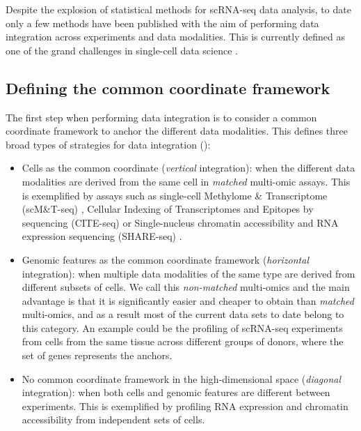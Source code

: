 Despite the explosion of statistical methods for scRNA-seq data analysis, to date only a few methods have been published with the aim of performing data integration across experiments and data modalities. This is currently defined as one of the grand challenges in single-cell data science \cite{Lahnemann2020}.

\subsection{Defining the common coordinate framework}

The first step when performing data integration is to consider a common coordinate framework to anchor the different data modalities. This defines three broad types of strategies for data integration (): 

\begin{itemize}

	\item Cells as the common coordinate (\textit{vertical} integration): when the different data modalities are derived from the same cell in \textit{matched} multi-omic assays. This is exemplified by assays such as single-cell Methylome \& Transcriptome (scM\&T-seq) \cite{Angermueller2016}, Cellular Indexing of Transcriptomes and Epitopes by sequencing (CITE-seq) \cite{Stoeckius2017} or Single-nucleus chromatin accessibility and RNA expression sequencing (SHARE-seq) \cite{Ma2020}.

	\item Genomic features as the common coordinate framework (\textit{horizontal} integration): when multiple data modalities of the same type are derived from different subsets of cells. We call this \textit{non-matched} multi-omics and the main advantage is that it is significantly easier and cheaper to obtain than \textit{matched} multi-omics, and as a result most of the current data sets to date belong to this category. An example could be the profiling of scRNA-seq experiments from cells from the same tissue across different groups of donors, where the set of genes represents the anchors.

	\item No common coordinate framework in the high-dimensional space (\textit{diagonal} integration): when both cells and genomic features are different between experiments. This is exemplified by profiling RNA expression and chromatin accessibility from independent sets of cells.

\end{itemize}

